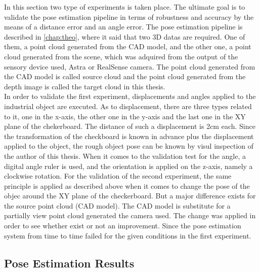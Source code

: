 In this section two type of experiments is taken place. The ultimate goal is to validate the pose estimation pipeline in terms of robustness and accuracy by the means of a distance error and an angle error. The pose estimation pipeline is described in \ref{chap:theo}, where it said that two 3D datas are required. One of them, a point cloud generated from the CAD model, and the other one, a point cloud generated from the scene, which was adquired from the output of the sensory device used, Astra or RealSense camera. The point cloud generated from the CAD model is called source cloud and the point cloud generated from the depth image is called the target cloud in this thesis.\\
In order to validate the first experiment, displacements and angles applied to the industrial object are executed. As to displacement, there are three types related to it, one in the x-axis, the other one in the y-axis and the last one in the XY plane of the chekerboard. The distance of such a displacement is 2cm each. Since the transformation of the checkboard is known in advance plus the displacement applied to the object, the rough object pose can be known by visul inspection of the author of this thesis. When it comes to the validation test for the angle, a digital angle ruler is used, and the orientation is applied on the z-axis, namely a clockwise rotation. For the validation of the second experiment, the same principle is applied as described above when it comes to change the pose of the objec around the XY plane of the checkerboard. But a major difference exists for the source point cloud (CAD model). The CAD model is substitute for a partially view point cloud generated the camera used. The change was applied in order to see whether exist or not an improvement. Since the pose estimation system from time to time failed for the given conditions in the first experiment.

\subsection{Pose Estimation Results}
 
